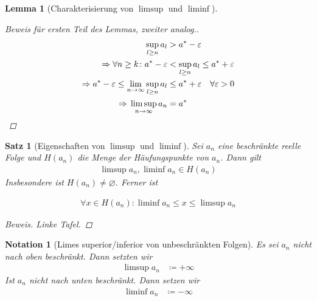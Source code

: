 \documentclass[11pt, twoside, a4paper]{article}
\theoremstyle{plain}
\newtheorem{lemma}[blockelement]{Lemma}
\newtheorem{satz}[blockelement]{Satz}
\newtheorem{notation}[blockelement]{Notation}
\newcommand{\impl}[0]{\Rightarrow{}}
\newcommand{\definedas}[0]{\coloneqq}
\renewcommand{\emptyset}{\varnothing}
\newcommand{\fromto}{\rightarrow{}}
\begin{document}
\begin{lemma}[Charakterisierung von $\limsup$ und $\liminf$]
\begin{proof}[Beweis für ersten Teil des Lemmas, zweiter analog.]
\begin{align*}
                \sup_{l\geq n} a_l &> a^{*} - \varepsilon\\
                \impl \forall n \geq k\colon a^{*} - \varepsilon &< \sup_{l\geq n} a_l \leq a^{*} + \varepsilon\\
                \impl a^{*} - \varepsilon \leq \lim_{n\fromto\infty} \sup_{l\geq n} a_l &\leq a^{*} + \varepsilon\quad \forall \varepsilon > 0\\
                \impl \limsup_{n\fromto\infty} a_n &= a^{*}\qedhere
            \end{align*}
        \end{proof}
    \end{lemma}

    \begin{satz}[Eigenschaften von $\limsup$ und $\liminf$]
        \label{satz:limsup-haeufungspunkt}
        Sei $a_n$ eine beschränkte reelle Folge und $H(a_n)$ die Menge der Häufungspunkte von $a_n$. Dann gilt
        \begin{align*}
            \limsup a_n, \liminf a_n \in H(a_n)
        \end{align*}
        Insbesondere ist $H(a_n) \neq \emptyset$. Ferner ist

        \begin{align*}
            \forall x \in H(a_n): \liminf a_n \leq x \leq \limsup a_{n}
        \end{align*}

        \begin{proof}
        [Beweis. Linke Tafel]
        \end{proof}
    \end{satz}

    \newpage

    \begin{notation}[Limes superior/inferior von unbeschränkten Folgen]
        Es sei $a_n$ nicht nach oben beschränkt. Dann setzten wir
        \begin{align*}
            \limsup a_n &\definedas +\infty
        \end{align*}
        Ist $a_n$ nicht nach unten beschränkt. Dann setzen wir
        \begin{align*}
            \liminf a_n &\definedas -\infty
        \end{align*}
    \end{notation}
\end{document}
